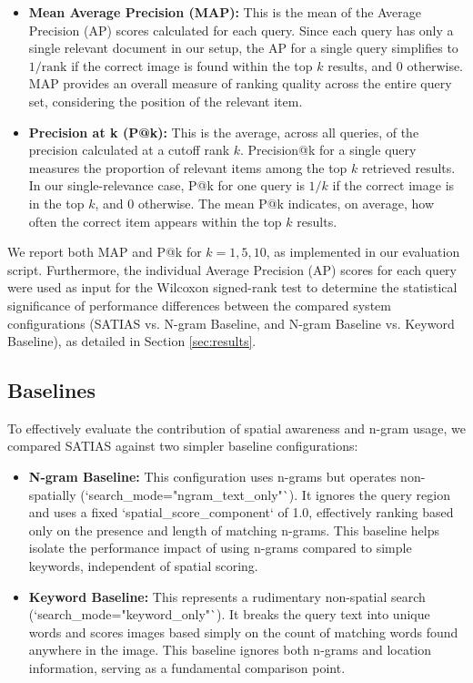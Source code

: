 \documentclass[manuscript,screen]{acmart}
\begin{document}
\begin{itemize}
    \item \textbf{Mean Average Precision (MAP):} This is the mean of the Average Precision (AP) scores calculated for each query. Since each query has only a single relevant document in our setup, the AP for a single query simplifies to $1/\text{rank}$ if the correct image is found within the top $k$ results, and 0 otherwise. MAP provides an overall measure of ranking quality across the entire query set, considering the position of the relevant item.
    \item \textbf{Precision at k (P@k):} This is the average, across all queries, of the precision calculated at a cutoff rank $k$. Precision@k for a single query measures the proportion of relevant items among the top $k$ retrieved results. In our single-relevance case, P@k for one query is $1/k$ if the correct image is in the top $k$, and 0 otherwise. The mean P@k indicates, on average, how often the correct item appears within the top $k$ results.
\end{itemize}

We report both MAP and P@k for $k=1, 5, 10$, as implemented in our evaluation script. Furthermore, the individual Average Precision (AP) scores for each query were used as input for the Wilcoxon signed-rank test to determine the statistical significance of performance differences between the compared system configurations (SATIAS vs. N-gram Baseline, and N-gram Baseline vs. Keyword Baseline), as detailed in Section \ref{sec:results}.

\subsection{Baselines}
\label{sec:baselines}

To effectively evaluate the contribution of spatial awareness and n-gram usage, we compared SATIAS against two simpler baseline configurations:

\begin{itemize}
    \item \textbf{N-gram Baseline:} This configuration uses n-grams but operates non-spatially (`search\_mode="ngram\_text\_only"`). It ignores the query region and uses a fixed `spatial\_score\_component` of 1.0, effectively ranking based only on the presence and length of matching n-grams. This baseline helps isolate the performance impact of using n-grams compared to simple keywords, independent of spatial scoring.
    \item \textbf{Keyword Baseline:} This represents a rudimentary non-spatial search (`search\_mode="keyword\_only"`). It breaks the query text into unique words and scores images based simply on the count of matching words found anywhere in the image. This baseline ignores both n-grams and location information, serving as a fundamental comparison point.
\end{itemize}
\end{document}
